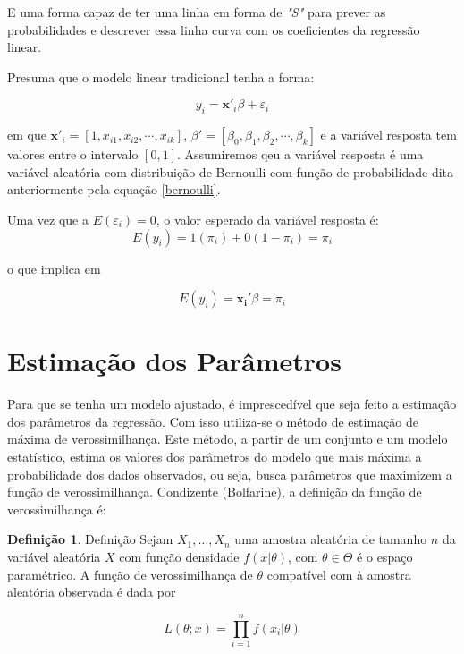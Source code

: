 \documentclass[
	12pt,				%
	openright,			%
	oneside,      %
	a4paper,			%
	english,			%
	french,				%
	spanish,			%
	brazil,				%
	]{abntex2}\usepackage[]{graphicx}\usepackage[table]{xcolor}
\theoremstyle{definition}
\newtheorem{definition}{Definição}[section]
\begin{document}
E uma forma capaz de ter uma linha em forma de \textit{"S"} para prever as probabilidades 
e descrever essa linha curva com os coeficientes da regressão linear.

Presuma que o modelo linear tradicional tenha a forma: 

\begin{equation}
  y_{i} = \mathbf{x'}_i \beta + \varepsilon_i
\end{equation}

\noindent em que $\mathbf{x'}_i = [1,x_{i1},x_{i2},\cdots,x_{ik}]$, $\beta' = 
[\beta_0,\beta_1,\beta_2,\cdots,\beta_k]$ e a variável resposta tem valores entre
o intervalo $[0,1]$. Assumiremos qeu a variável resposta é uma variável aleatória 
com distribuição de Bernoulli com função de probabilidade dita anteriormente pela 
equação \ref{bernoulli}.

Uma vez que a $E(\varepsilon_i) = 0$, o valor esperado da variável resposta é:
\begin{equation}
  E(y_i) = 1(\pi_i) + 0(1 - \pi_i)= \pi_i
\end{equation}

\noindent o que implica em 


$$
E(y_i) = \mathbf{x_i'}\beta = \pi_i
$$


    \section{Estimação dos Parâmetros}
    
Para que se tenha um modelo ajustado, é imprescedível que seja feito a estimação dos parâmetros da regressão. 
Com isso utiliza-se o método de estimação de máxima de verossimilhança. Este método, a partir de um conjunto e um modelo estatístico, estima os valores dos parâmetros do modelo que mais máxima a probabilidade dos dados observados, ou seja, busca parâmetros que maximizem a função de verossimilhança. Condizente (Bolfarine), a definição da função de verossimilhança é:

\begin{definition}{Definição}
    Sejam $X_1,\ldots,X_n$ uma amostra aleatória de tamanho $n$ da variável aleatória $X$ com função densidade $f(x|\theta)$, com $\theta \in \Theta$ é o espaço paramétrico. A função de verossimilhança de $\theta$ compatível com à amostra aleatória observada é dada por 
\end{definition}

\begin{equation}
    L(\theta;x) = \prod_{i = 1}^{n}f(x_i|\theta)
\end{equation}
\end{document}
